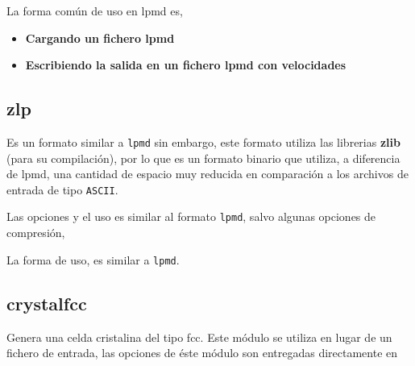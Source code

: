 
La forma com\'un de uso en lpmd es,

\begin{itemize}
 \item \textbf{Cargando un fichero lpmd}
 \item \textbf{Escribiendo la salida en un fichero lpmd con velocidades}
\end{itemize}

\subsection{zlp}

Es un formato similar a \verb|lpmd| sin embargo, este formato utiliza las librerias \textbf{zlib} (para su compilaci\'on), por lo que es un formato binario que utiliza, a diferencia de lpmd, una cantidad de espacio muy reducida en comparaci\'on a los archivos de entrada de tipo \verb|ASCII|.

Las opciones y el uso es similar al formato \verb|lpmd|, salvo algunas opciones de compresi\'on, 


La forma de uso, es similar a \verb|lpmd|.

\subsection{crystalfcc}
Genera una celda cristalina del tipo fcc. Este m\'odulo se utiliza en lugar de un fichero de entrada, las opciones de \'este m\'odulo son entregadas directamente en
